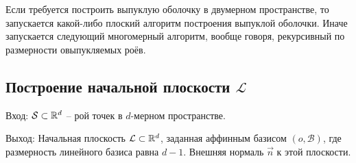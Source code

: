 \documentclass[a4paper,12pt]{article}
\newcommand{\R}[1][]{%
  \ifthenelse{\equal{#1}{}}%
  {\mathbb{R}}%
  {\mathbb{R}^{#1}}}
\newcommand{\Swarm}{\mathcal{S}}              %
\newcommand{\Basis}{\mathcal{B}}              %
\newcommand{\Plane}{\mathcal{L}}           %
\renewcommand{\.}{\hspace{0.2ex}}
\begin{document}
  Если требуется построить выпуклую оболочку в двумерном пространстве, то запускается какой-либо плоский алгоритм построения выпуклой оболочки. Иначе запускается следующий многомерный алгоритм, вообще говоря, рекурсивный по размерности овыпукляемых роёв.

  \subsection{Построение начальной плоскости $\Plane$}
  \label{subsec:InitialPlane}

    Вход: $\Swarm \subset \R[d]$ -- рой точек в $d$-мерном пространстве.

    Выход: Начальная плоскость $\Plane \subset \R[d]$, заданная аффинным базисом $(o,\Basis)$, где размерность линейного базиса равна $d-1$. Внешняя нормаль $\vec n$ к этой плоскости.
\end{document}
